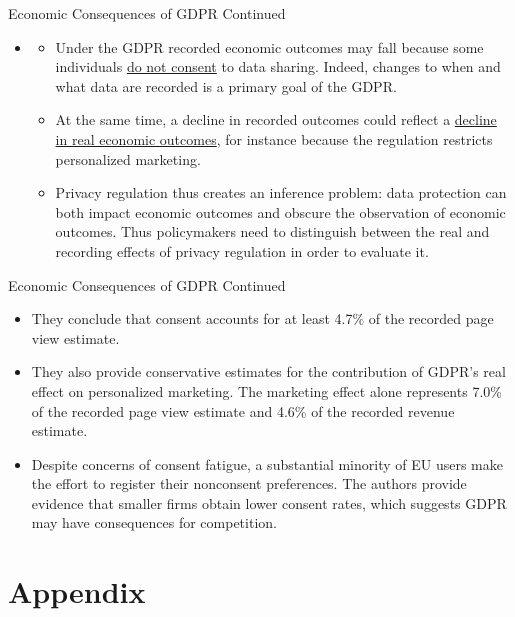 \documentclass[pdf]{beamer}
\theoremstyle{remark}
\theoremstyle{definition}
\begin{document}
\begin{frame}[t]{Economic Consequences of GDPR Continued}
  \begin{itemize}
    \item [] 
    \begin{itemize}
      \item Under the GDPR recorded economic outcomes may fall because some individuals \underline{do not consent} to data sharing. Indeed, changes to when and what data are recorded is a primary goal of the GDPR. 
      \item At the same time, a decline in recorded outcomes could reflect a \underline{decline in real economic outcomes}, for instance because the regulation restricts personalized marketing.
      \item  Privacy regulation thus creates an inference problem: data protection can both impact economic outcomes and obscure the observation of economic outcomes. Thus policymakers need to distinguish between the real and recording effects of privacy regulation in order to evaluate it.
    \end{itemize}
  \end{itemize}
\end{frame}

\begin{frame}[t]{Economic Consequences of GDPR Continued}
\begin{itemize}
\item They conclude that consent accounts for at least 4.7\% of the recorded page view estimate. 
\item They also provide conservative estimates for the contribution of GDPR's real effect on personalized marketing. The marketing effect alone represents 7.0\% of the recorded page view estimate and 4.6\% of the recorded revenue estimate.
\item Despite concerns of consent fatigue, a substantial minority of EU users make the effort to register their nonconsent preferences. The authors provide evidence that smaller firms obtain lower consent rates, which suggests GDPR may have consequences for competition.
\end{itemize}
\end{frame}

\section{Appendix}
\end{document}
